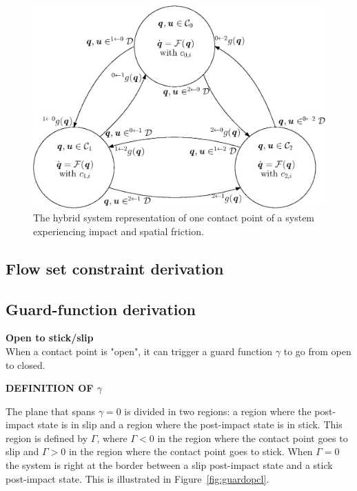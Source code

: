\documentclass[DC2017114Bouma.tex]{subfiles}
\begin{document}
\begin{figure}[H]
\centering
\includegraphics[width=.8\textwidth]{nodehybrid.eps}\caption{The hybrid system representation of one contact point of a system experiencing impact and spatial friction.}\label{fig:nodehybrid}
\end{figure}

\subsection{Flow set constraint derivation}\label{app:constraints}


\subsection{Guard-function derivation}\label{app:guards}
\textbf{Open to stick/slip}\\
When a contact point is "open", it can trigger a guard function $\gamma$ to go from open to closed.

\textbf{DEFINITION OF $\gamma$}

The plane that spans $\gamma = 0$ is divided in two regions: a region where the post-impact state is in slip and a region where the post-impact state is in stick. This region is defined by $\Gamma$, where $\Gamma<0$ in the region where the contact point goes to slip and $\Gamma > 0$ in the region where the contact point goes to stick. When $\Gamma = 0$ the system is right at the border between a slip post-impact state and a stick post-impact state. This is illustrated in Figure~\ref{fig:guardopcl}. 
\end{document}
